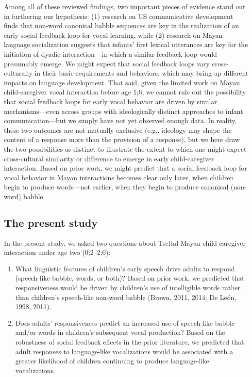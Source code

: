 \documentclass[
  man]{apa6}
\begin{document}
Among all of these reviewed findings, two important pieces of evidence stand out in furthering our hypothesis: (1) research on US communicative development finds that non-word canonical babble sequences are key in the realization of an early social feedback loop for vocal learning, while (2) research on Mayan language socialization suggests that infants' first lexical utterances are key for the initiation of dyadic interaction---in which a similar feedback loop would presumably emerge. We might expect that social feedback loops vary cross-culturally in their basic requirements and behaviors, which may bring up different impacts on language development. That said, given the limited work on Mayan child-caregiver vocal interaction before age 1;6, we cannot rule out the possibility that social feedback loops for early vocal behavior are driven by similar mechanisms---even across groups with ideologically distinct approaches to infant communication---but we simply have not yet observed enough data. In reality, these two outcomes are not mutually exclusive (e.g., ideology may shape the content of a response more than the provision of a response), but we here draw the two possibilities as distinct to illustrate the extent to which one might expect cross-cultural similarity or difference to emerge in early child-caregiver interaction. Based on prior work, we might predict that a social feedback loop for vocal behavior in Mayan interactions becomes clear only later, when children begin to produce words---not earlier, when they begin to produce canonical (non-word) babble.

\hypertarget{the-present-study}{%
\subsection{The present study}\label{the-present-study}}

In the present study, we asked two questions about Tseltal Mayan child-caregiver interaction under age two (0;2--2;0):

\begin{enumerate}
\def\labelenumi{\arabic{enumi}.}
\item
  What linguistic features of children's early speech drive adults to respond (speech-like babble, words, or both)? Based on prior work, we predicted that responsiveness would be driven by children's use of intelligible words rather than children's speech-like non-word babble (Brown, 2011, 2014; De León, 1998, 2011).
\item
  Does adults' responsiveness predict an increased use of speech-like babble and/or words in children's subsequent vocal production? Based on the robustness of social feedback effects in the prior literature, we predicted that adult responses to language-like vocalizations would be associated with a greater likelihood of children continuing to produce language-like vocalizations.
\end{enumerate}
\end{document}
